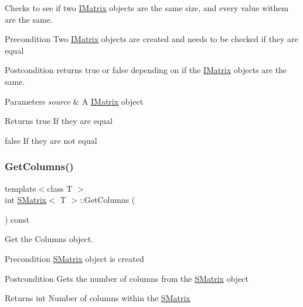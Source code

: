 Checks to see if two \mbox{\hyperlink{class_i_matrix}{I\+Matrix}} objects are the same size, and every value withem are the same. 

\begin{DoxyPrecond}{Precondition}
Two \mbox{\hyperlink{class_i_matrix}{I\+Matrix}} objects are created and needs to be checked if they are equal 
\end{DoxyPrecond}
\begin{DoxyPostcond}{Postcondition}
returns true or false depending on if the \mbox{\hyperlink{class_i_matrix}{I\+Matrix}} objects are the same.
\end{DoxyPostcond}

\begin{DoxyParams}{Parameters}
{\em source} & A \mbox{\hyperlink{class_i_matrix}{I\+Matrix}} object \\
\hline
\end{DoxyParams}
\begin{DoxyReturn}{Returns}
true If they are equal 

false If they are not equal 
\end{DoxyReturn}
\mbox{\label{class_s_matrix_a5933f5269b187ef02e892de067c09481}} 
\subsubsection{\texorpdfstring{GetColumns()}{GetColumns()}}
{\footnotesize\ttfamily template$<$class T $>$ \\
int \mbox{\hyperlink{class_s_matrix}{S\+Matrix}}$<$ T $>$\+::Get\+Columns (\begin{DoxyParamCaption}{ }\end{DoxyParamCaption}) const\hspace{0.3cm}{\ttfamily [virtual]}}



Get the Columns object. 

\begin{DoxyPrecond}{Precondition}
\mbox{\hyperlink{class_s_matrix}{S\+Matrix}} object is created 
\end{DoxyPrecond}
\begin{DoxyPostcond}{Postcondition}
Gets the number of columns from the \mbox{\hyperlink{class_s_matrix}{S\+Matrix}} object 
\end{DoxyPostcond}
\begin{DoxyReturn}{Returns}
int Number of columns within the \mbox{\hyperlink{class_s_matrix}{S\+Matrix}} 
\end{DoxyReturn}


